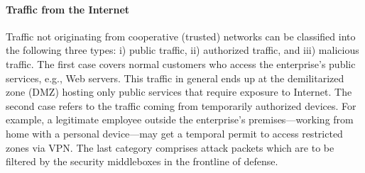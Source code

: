 \paragraph{Traffic from the Internet}
Traffic not originating from cooperative (trusted) networks can be classified 
into the following three types: i) public traffic, ii) authorized traffic, and iii) 
malicious traffic. The first case covers normal customers who access the enterprise's 
public services, e.g., Web servers. This traffic in general ends up at the demilitarized zone 
(DMZ) hosting only public services that require exposure to Internet. 
The second case refers to the traffic coming from temporarily authorized devices. For example,
a legitimate employee outside the enterprise's premises---working from home with a personal 
device---may get a temporal permit to access restricted zones via VPN. The last 
category comprises attack packets which are to be filtered by the security middleboxes in the frontline of defense.




